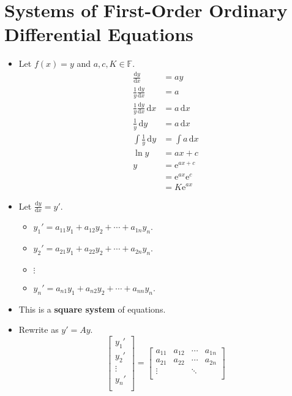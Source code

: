 \documentclass{article}
\newcommand{\dy}{\text{d}y}
\newcommand{\dx}{\text{d}x}
\newcommand{\e}{\text{e}}
\begin{document}
\section*{Systems of First-Order Ordinary Differential Equations}
\begin{itemize}
    \item {}Let $f(x)=y$ and $a,c,K\in\mathbb{F}$.
    \begin{align*}
        \frac{\dy}{\dx} &= ay\\
        \frac{1}{y}\frac{\dy}{\dx} &= a\\
        \frac{1}{y}\frac{\dy}{\dx}\, \dx &= a\, \dx\\
        \frac{1}{y}\, \dy &= a\, \dx\\
        \int \frac{1}{y}\, \dy &= \int a\, \dx\\
        \ln y &= ax+c\\
        y &= \e^{ax+c}\\
        &= \e^{ax}\text{e}^c\\
        &= K\e^{ax}
    \end{align*}
    \item Let $\frac{\dy}{\dx}=y'$.
    \begin{itemize}
        \item $y_1' = a_{11}y_1+a_{12}y_2+\cdots+a_{1n}y_n$.
        \item $y_2' = a_{21}y_1+a_{22}y_2+\cdots+a_{2n}y_n$.
        \item $\vdots$
        \item $y_n' = a_{n1}y_1+a_{n2}y_2+\cdots+a_{nn}y_n$.
    \end{itemize}
    \item This is a \textbf{square system} of equations.
    \item Rewrite as $y' = Ay$.
    \begin{equation*}
        \begin{bmatrix}
            y_1'\\
            y_2'\\
            \vdots\\
            y_n'\\
        \end{bmatrix}
        =
        \begin{bmatrix}
            a_{11} & a_{12} & \cdots & a_{1n}\\
            a_{21} & a_{22} & \cdots & a_{2n}\\
            \vdots &        & \ddots &       \\

\end{bmatrix}
\end{equation*}
\end{itemize}
\end{document}
